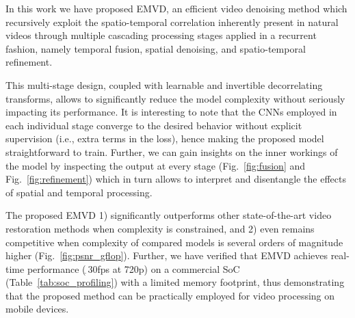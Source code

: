 \documentclass[final]{cvpr}
\newcommand{\textapprox}{$_{\widetilde{~}}$}
\begin{document}
    In this work we have proposed EMVD, an efficient video denoising method which recursively exploit the spatio-temporal correlation inherently present in natural videos through multiple cascading processing stages applied in a recurrent fashion, namely temporal fusion, spatial denoising, and spatio-temporal refinement.

    This multi-stage design, coupled with learnable and invertible decorrelating transforms, allows to significantly reduce the model complexity without seriously impacting its performance. It is interesting to note that the CNNs employed in each individual stage converge to the desired behavior without explicit supervision (i.e., extra terms in the loss), hence making the proposed model straightforward to train. Further, we can gain insights on the inner workings of the model by inspecting the output at every stage (Fig.~\ref{fig:fusion} and Fig.~\ref{fig:refinement}) which in turn allows to interpret and disentangle the effects of spatial and temporal processing.
    
    The proposed EMVD 1) significantly outperforms other state-of-the-art video restoration methods when complexity is constrained, and 2) even remains competitive when complexity of compared models is several orders of magnitude higher (Fig.~\ref{fig:psnr_gflop}). Further, we have verified that EMVD achieves real-time performance (\textapprox30fps at 720p) on a commercial SoC (Table~\ref{tab:soc_profiling}) with a limited memory footprint, thus demonstrating that the proposed method can be practically employed for video processing on mobile devices.
    
    
    {\small
        
        
    }
    
\end{document}
